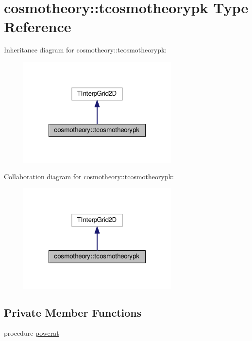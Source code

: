 \hypertarget{structcosmotheory_1_1tcosmotheorypk}{}\section{cosmotheory\+:\+:tcosmotheorypk Type Reference}
\label{structcosmotheory_1_1tcosmotheorypk}


Inheritance diagram for cosmotheory\+:\+:tcosmotheorypk\+:
\nopagebreak
\begin{figure}[H]
\begin{center}
\leavevmode
\includegraphics[width=228pt]{structcosmotheory_1_1tcosmotheorypk__inherit__graph}
\end{center}
\end{figure}


Collaboration diagram for cosmotheory\+:\+:tcosmotheorypk\+:
\nopagebreak
\begin{figure}[H]
\begin{center}
\leavevmode
\includegraphics[width=228pt]{structcosmotheory_1_1tcosmotheorypk__coll__graph}
\end{center}
\end{figure}
\subsection*{Private Member Functions}
\begin{DoxyCompactItemize}
\item 
procedure \mbox{\hyperlink{structcosmotheory_1_1tcosmotheorypk_a372960b05a2088335f35fd11b5189b81}{powerat}}
\end{DoxyCompactItemize}
